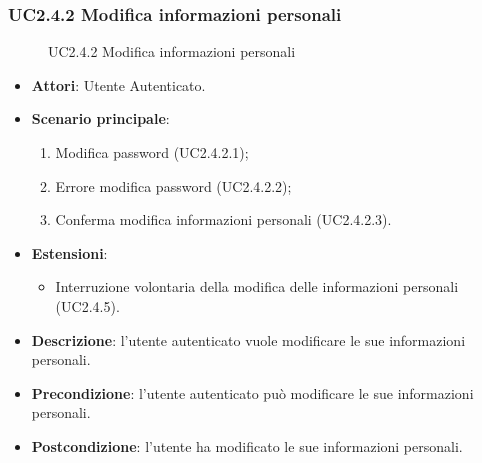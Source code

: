 \subsubsection{UC2.4.2 Modifica informazioni personali}
\begin{figure}[H]
\centering
\noindent{}
\caption{UC2.4.2 Modifica informazioni personali}
\end{figure}
\begin{itemize}
\item \textbf{Attori}: Utente Autenticato.
\item \textbf{Scenario principale}:
\begin{enumerate}
\item Modifica password (UC2.4.2.1);
\item Errore modifica password (UC2.4.2.2);
\item Conferma modifica informazioni personali (UC2.4.2.3).
\end{enumerate}
\item \textbf{Estensioni}:
\begin{itemize}
\item Interruzione volontaria della modifica delle informazioni personali (UC2.4.5).
\end{itemize}
\item \textbf{Descrizione}: l'utente autenticato vuole modificare le sue informazioni personali.
\item \textbf{Precondizione}: l'utente autenticato può modificare le sue informazioni personali.
\item \textbf{Postcondizione}: l'utente ha modificato le sue informazioni personali.
\end{itemize}
